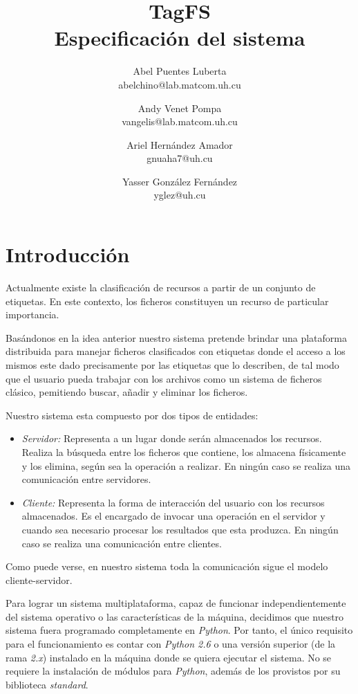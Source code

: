 \documentclass{article}
\title{
	\LARGE{TagFS} \\
	\Large{Especificación del sistema}
}
\author{
  	Abel Puentes Luberta \\
  	\small{abelchino@lab.matcom.uh.cu}
  	\and
  	Andy Venet Pompa \\
  	\small{vangelis@lab.matcom.uh.cu}
  	\and
  	Ariel Hernández Amador \\
  	\small{gnuaha7@uh.cu}
  	\and
  	Yasser González Fernández \\
  	\small{yglez@uh.cu} 	
}
\date{}
\begin{document}
\maketitle

\thispagestyle{empty}

\newpage

\setcounter{page}{1}

\section{Introducción}

Actualmente existe la clasificación de recursos a partir de un conjunto de 
etiquetas. En este contexto, los ficheros constituyen un recurso de particular 
importancia. 

Basándonos en la idea anterior nuestro sistema pretende brindar una plataforma
distribuida para manejar ficheros clasificados con etiquetas donde el acceso
a los mismos este dado precisamente por las etiquetas que lo describen, de tal
modo que el usuario pueda trabajar con los archivos como un sistema de ficheros
clásico, pemitiendo buscar, añadir y eliminar los ficheros.

Nuestro sistema esta compuesto por dos tipos de entidades:

\begin{itemize}
  \item \emph{Servidor:} Representa a un lugar  donde serán almacenados los
  recursos. Realiza la búsqueda entre los ficheros que contiene, los almacena
  físicamente y los elimina, según sea la operación a realizar. En ningún caso
  se realiza una comunicación entre servidores.
  
  \item \emph{Cliente:} Representa la forma de interacción del usuario con los
  recursos almacenados. Es el encargado de invocar una operación en el servidor
  y cuando sea necesario procesar los resultados que esta produzca. En ningún
  caso se realiza una comunicación entre clientes.
\end{itemize}

Como puede verse, en nuestro sistema toda la comunicación sigue el modelo
cliente-servidor.

Para lograr un sistema multiplataforma, capaz de funcionar independientemente
del sistema operativo o las características de la máquina, decidimos que nuestro
sistema fuera programado completamente en \emph{Python}. Por tanto, el único
requisito para el funcionamiento es contar con \emph{Python 2.6} o una versión
superior (de la rama \emph{2.x}) instalado en la máquina donde se quiera ejecutar 
el sistema. No se requiere la instalación de módulos para \emph{Python},
además de los provistos por su biblioteca \emph{standard}.
\end{document}
